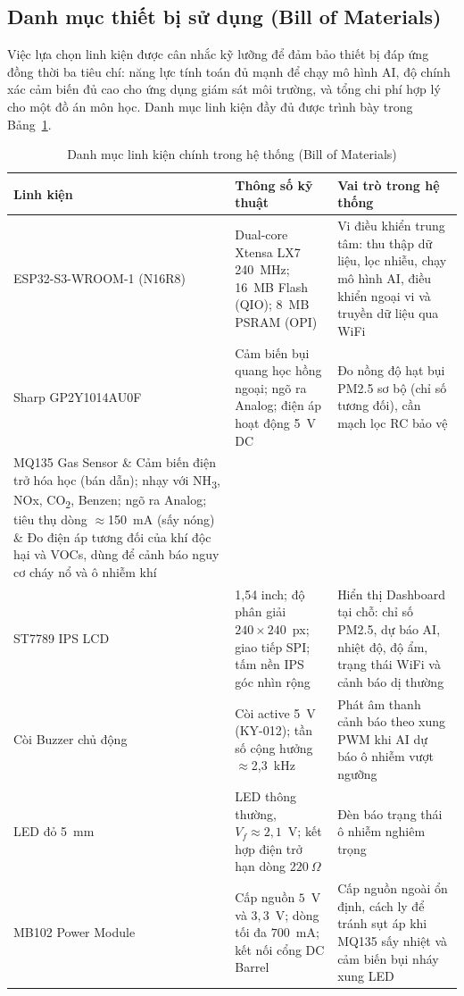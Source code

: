 \documentclass[12pt,a4paper]{article}
\begin{document}
\subsection{Danh mục thiết bị sử dụng (Bill of Materials)}

Việc lựa chọn linh kiện được cân nhắc kỹ lưỡng để đảm bảo thiết bị đáp ứng đồng thời ba tiêu chí: năng lực tính toán đủ mạnh để chạy mô hình AI, độ chính xác cảm biến đủ cao cho ứng dụng giám sát môi trường, và tổng chi phí hợp lý cho một đồ án môn học. Danh mục linh kiện đầy đủ được trình bày trong Bảng~\ref{tab:bom}.

\begin{table}[H]
  \centering
  \caption{Danh mục linh kiện chính trong hệ thống (Bill of Materials)}
  \label{tab:bom}
  \small
  \begin{tabular}{p{3.8cm} p{5cm} p{6.5cm}}
    \toprule
    \textbf{Linh kiện} & \textbf{Thông số kỹ thuật} & \textbf{Vai trò trong hệ thống} \\
    \midrule
    ESP32-S3-WROOM-1 (N16R8) & Dual-core Xtensa LX7 240~MHz; 16~MB Flash (QIO); 8~MB PSRAM (OPI) & Vi điều khiển trung tâm: thu thập dữ liệu, lọc nhiễu, chạy mô hình AI, điều khiển ngoại vi và truyền dữ liệu qua WiFi \\
    \midrule
    Sharp GP2Y1014AU0F & Cảm biến bụi quang học hồng ngoại; ngõ ra Analog; điện áp hoạt động 5~V DC & Đo nồng độ hạt bụi PM2.5 sơ bộ (chỉ số tương đối), cần mạch lọc RC bảo vệ \\
    \midrule
    MQ135 Gas Sensor \& Cảm biến điện trở hóa học (bán dẫn); nhạy với NH\textsubscript{3}, NOx, CO\textsubscript{2}, Benzen; ngõ ra Analog; tiêu thụ dòng $\approx$150~mA (sấy nóng) \& Đo điện áp tương đối của khí độc hại và VOCs, dùng để cảnh báo nguy cơ cháy nổ và ô nhiễm khí \\

    ST7789 IPS LCD & 1,54 inch; độ phân giải $240 \times 240$~px; giao tiếp SPI; tấm nền IPS góc nhìn rộng & Hiển thị Dashboard tại chỗ: chỉ số PM2.5, dự báo AI, nhiệt độ, độ ẩm, trạng thái WiFi và cảnh báo dị thường \\
    \midrule
    Còi Buzzer chủ động & Còi active 5~V (KY-012); tần số cộng hưởng $\approx$2,3~kHz & Phát âm thanh cảnh báo theo xung PWM khi AI dự báo ô nhiễm vượt ngưỡng \\
    \midrule
    LED đỏ 5~mm & LED thông thường, $V_f \approx 2{,}1$~V; kết hợp điện trở hạn dòng $220~\Omega$ & Đèn báo trạng thái ô nhiễm nghiêm trọng \\
    \midrule
    MB102 Power Module & Cấp nguồn $5$~V và $3{,}3$~V; dòng tối đa $700$~mA; kết nối cổng DC Barrel & Cấp nguồn ngoài ổn định, cách ly để tránh sụt áp khi MQ135 sấy nhiệt và cảm biến bụi nháy xung LED \\
    \bottomrule
  \end{tabular}
\end{table}
\end{document}
